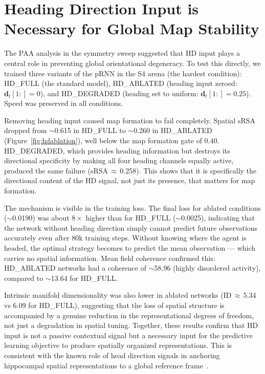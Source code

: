 \documentclass[11pt, a4paper]{article}
\begin{document}
\section*{Heading Direction Input is Necessary for Global Map Stability}
\label{sec:hdablation}

The PAA analysis in the symmetry sweep suggested that HD input plays a
central role in preventing global orientational degeneracy. To test this
directly, we trained three variants of the pRNN in the S4 arena (the
hardest condition): HD\_FULL (the standard model), HD\_ABLATED (heading
input zeroed: $\mathbf{d}_t[1:] = 0$), and HD\_DEGRADED (heading set to
uniform: $\mathbf{d}_t[1:] = 0.25$). Speed was preserved in all
conditions.

Removing heading input caused map formation to fail completely. Spatial
sRSA dropped from $\sim$0.615 in HD\_FULL to
$\sim$0.260 in HD\_ABLATED (Figure~\ref{fig:hdablation}),
well below the map formation gate of $0.40$. HD\_DEGRADED, which provides
heading information but destroys its directional specificity by making all
four heading channels equally active, produced the same failure
(sRSA\,$\approx$\,0.258). This shows that it is
specifically the directional content of the HD signal, not just its
presence, that matters for map formation.

The mechanism is visible in the training loss. The final loss for ablated
conditions ($\sim$0.0190) was about $8\times$ higher than
for HD\_FULL ($\sim$0.0025), indicating that the network
without heading direction simply cannot predict future observations
accurately even after 80k training steps. Without knowing where the agent
is headed, the optimal strategy becomes to predict the mean observation ---
which carries no spatial information. Mean field coherence confirmed this:
HD\_ABLATED networks had a coherence of $\sim$58.96
(highly disordered activity), compared to $\sim$13.64 for
HD\_FULL.

Intrinsic manifold dimensionality was also lower in ablated networks
(ID\,$\approx$\,5.34 vs 6.09 for
HD\_FULL), suggesting that the loss of spatial structure is accompanied by
a genuine reduction in the representational degrees of freedom, not just
a degradation in spatial tuning. Together, these results confirm that HD
input is not a passive contextual signal but a necessary input for the
predictive learning objective to produce spatially organized representations.
This is consistent with the known role of head direction signals in
anchoring hippocampal spatial representations to a global reference
frame~\citep{lever2002}.
\end{document}
